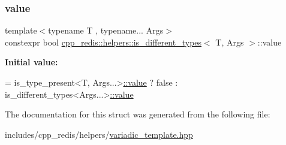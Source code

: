 \subsubsection{\texorpdfstring{value}{value}}
{\footnotesize\ttfamily template$<$typename T , typename... Args$>$ \\
constexpr bool \hyperlink{structcpp__redis_1_1helpers_1_1is__different__types}{cpp\+\_\+redis\+::helpers\+::is\+\_\+different\+\_\+types}$<$ T, Args $>$\+::value\hspace{0.3cm}{\ttfamily [static]}}

{\bfseries Initial value\+:}
\begin{DoxyCode}
= is\_type\_present<T, Args...>\hyperlink{structcpp__redis_1_1helpers_1_1is__different__types_a07dadd8ff3c8024734f231aaf1555626}{::value}
                                  ? false
                                  : is\_different\_types<Args...>\hyperlink{structcpp__redis_1_1helpers_1_1is__different__types_a07dadd8ff3c8024734f231aaf1555626}{::value}
\end{DoxyCode}


The documentation for this struct was generated from the following file\+:\begin{DoxyCompactItemize}
\item 
includes/cpp\+\_\+redis/helpers/\hyperlink{variadic__template_8hpp}{variadic\+\_\+template.\+hpp}\end{DoxyCompactItemize}
